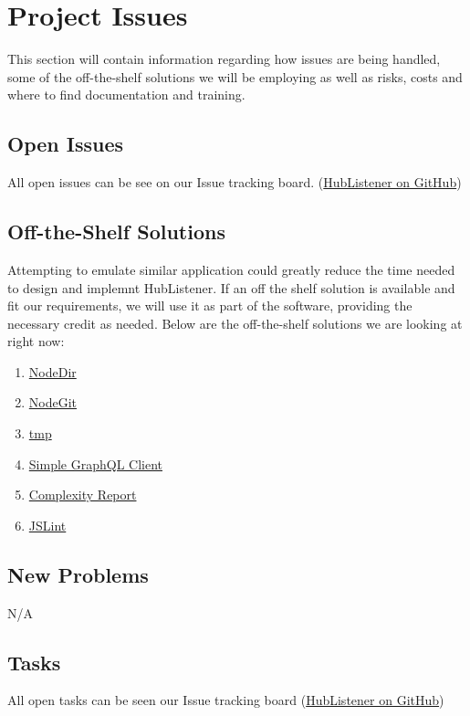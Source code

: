 \documentclass{article}
\begin{document}
\newpage
\section{Project Issues }
This section will contain information regarding how issues are being handled, some of the off-the-shelf solutions we will be employing as well as risks, costs and where to find documentation and training. 

\subsection{Open Issues}
All open issues can be see on our Issue tracking board. (\href{https://github.com/pjmc-oliveira/HubListener/projects/1}{HubListener on GitHub})
\subsection{Off-the-Shelf Solutions}
Attempting to emulate similar application could greatly reduce the time needed to design and implemnt HubListener. If an off the shelf solution is available and fit our requirements, we will use it as part of the software, providing the necessary credit as needed. Below are the off-the-shelf solutions we are looking at right now:

\begin{enumerate}

\item  \href{https://www.npmjs.com/package/node-dir}{NodeDir} 
\item  \href{https://www.npmjs.com/package/nodegit}{NodeGit}
\item  \href{https://www.npmjs.com/package/tmp}{tmp} 
\item  \href{https://www.npmjs.com/package/graphql-client}{Simple GraphQL Client} 
\item  \href{https://www.npmjs.com/package/complexity-report#complexity-metrics}{Complexity Report} 
\item \href{https://www.npmjs.com/package/jslint}{JSLint}

\end{enumerate}
\subsection{New Problems}

N/A

\subsection{Tasks}
All open tasks can be seen our Issue tracking board (\href{https://github.com/pjmc-oliveira/HubListener/projects/1}{HubListener on GitHub})
\end{document}
